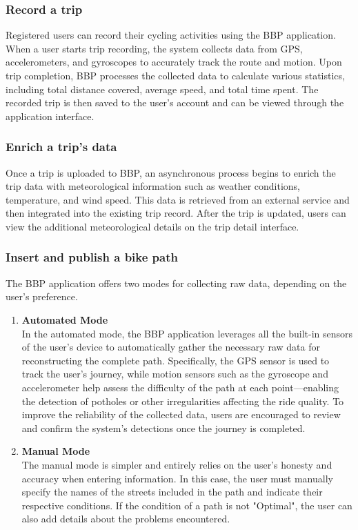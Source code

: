 \subsubsection*{Record a trip}
Registered users can record their cycling activities using the BBP application. When a user starts trip recording, the system collects data from GPS, accelerometers, and gyroscopes to accurately track the route and motion. Upon trip completion, BBP processes the collected data to calculate various statistics, including total distance covered, average speed, and total time spent. The recorded trip is then saved to the user's account and can be viewed through the application interface.

\subsubsection*{Enrich a trip's data}

Once a trip is uploaded to BBP, an asynchronous process begins to enrich the trip data with meteorological information such as weather conditions, temperature, and wind speed. This data is retrieved from an external service and then integrated into the existing trip record. After the trip is updated, users can view the additional meteorological details on the trip detail interface.


\subsubsection*{Insert and publish a bike path}

The BBP application offers two modes for collecting raw data, depending on the user’s preference.\\
\begin{enumerate}
    \item \textbf{Automated Mode}\\
In the automated mode, the BBP application leverages all the built-in sensors of the user’s device to automatically gather the necessary raw data for reconstructing the complete path. Specifically, the GPS sensor is used to track the user’s journey, while motion sensors such as the gyroscope and accelerometer help assess the difficulty of the path at each point—enabling the detection of potholes or other irregularities affecting the ride quality.
To improve the reliability of the collected data, users are encouraged to review and confirm the system’s detections once the journey is completed.
    \item \textbf{Manual Mode} \\
The manual mode is simpler and entirely relies on the user’s honesty and accuracy when entering information. In this case, the user must manually specify the names of the streets included in the path and indicate their respective conditions. If the condition of a path is not "Optimal", the user can also add details about the problems encountered.
\end{enumerate}

